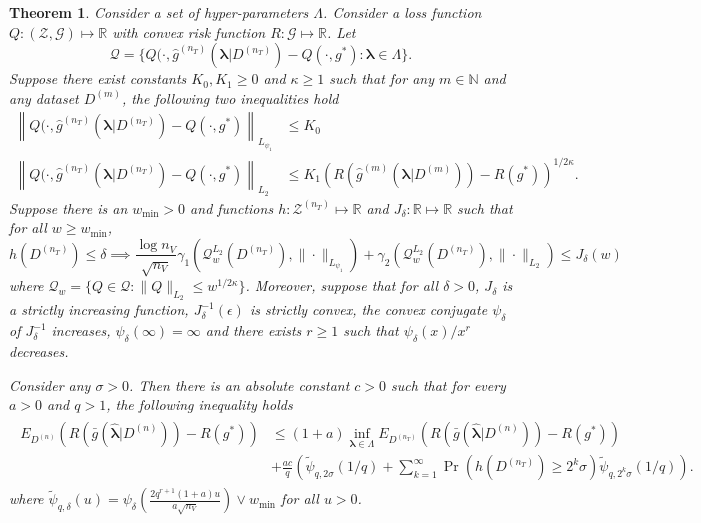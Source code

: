 \documentclass[10pt]{book}
\newtheorem{theorem}{Theorem}
\theoremstyle{definition}
\begin{document}
\begin{theorem}
	\label{thrm:jean_cv}
	Consider a set of hyper-parameters $\Lambda$. Consider a loss function $Q:(\mathcal{Z}, \mathcal{G}) \mapsto \mathbb{R}$ with convex risk function $R: \mathcal{G} \mapsto \mathbb{R}$. Let
	$$
	\mathcal{Q} = \{ 
	Q(\cdot, \hat{g}^{(n_T)}(\boldsymbol{\lambda} | D^{(n_T)}) - Q(\cdot, g^*) : \boldsymbol{\lambda} \in \Lambda \}.
	$$
	Suppose there exist constants $K_0, K_1 \ge 0$ and $\kappa \ge 1$ such that for any $m \in \mathbb{N}$ and any dataset $D^{(m)}$, the following two inequalities hold
	\begin{align}
	\left \| Q(\cdot, \hat{g}^{(n_T)}(\boldsymbol{\lambda} | D^{(n_T)}) - Q(\cdot, g^*) \right \|_{L_{\psi_1}} & \le K_0
	\label{eq:cv_assump1}\\
	\left \| Q(\cdot, \hat{g}^{(n_T)}(\boldsymbol{\lambda} | D^{(n_T)}) - Q(\cdot, g^*)  \right \|_{L_2} & \le 
	K_1 \left ( R(\hat{g}^{(m)}(\boldsymbol{\lambda}|D^{(m)})) - R(g^*) \right )^{1/2\kappa}.
	\label{eq:cv_assump2}
	\end{align}
	Suppose there is an $w_{\min} > 0$ and
	functions $h: {\mathcal{Z}}^{(n_T)} \mapsto \mathbb{R}$
	and $J_\delta: \mathbb{R}\mapsto \mathbb{R}$ such that
	for all $w \ge w_{\min}$,
	\[
	h(D^{(n_{T})})\le\delta\implies
	\frac{\log n_{V}}{\sqrt{n_{V}}}
	\gamma_{1}\left(\mathcal{Q}_{w}^{L_{2}}(D^{(n_{T})}),\|\cdot\|_{L_{\psi_{1}}}\right)
	+\gamma_{2}\left(\mathcal{Q}_{w}^{L_{2}}(D^{(n_{T})}),\|\cdot\|_{L_{2}}\right)\le J_{\delta}(w)
	\]
	where $\mathcal{Q}_w = \{Q \in \mathcal{Q}: \| Q \|_{L_2} \le w^{1/2\kappa} \}$.
	Moreover, suppose that for all $\delta > 0$, $J_\delta$ is a strictly increasing function, $J_\delta^{-1}(\epsilon)$ is strictly convex,
	the convex conjugate $\psi_\delta$ of $J^{-1}_\delta$ increases, $\psi_\delta(\infty ) = \infty$ and there exists $r \ge 1$ such that $\psi_\delta(x)/x^r$ decreases.
	
	Consider any $\sigma > 0$. Then there is an absolute constant $c > 0$ such that for every $a > 0$ and $q > 1$, the following inequality holds
	\begin{align}
	\begin{split}
	E_{D^{(n)}} 
	\left(
	R\left(\bar{g} ( \hat{\boldsymbol \lambda} | {D^{(n)}} ) \right )
	- R (g^*)
	\right)
	&\le
	(1+a) \inf_{\boldsymbol{\lambda} \in \Lambda} 
	E_{D^{(n_T)}}
	\left(
	R\left(\bar{g} ( \hat{\boldsymbol \lambda} | {D^{(n)}} ) \right )
	- R (g^*)
	\right)
	\\
	& +
	\frac{ac}{q}
	\left(
	\tilde{\psi}_{q,2\sigma}(1/q)
	+\sum_{k=1}^{\infty}
	\Pr\left(h\left(D^{(n_{T})}\right)\ge2^{k}\sigma\right)
	\tilde{\psi}_{q,2^{k}\sigma}(1/q)
	\right).
	\end{split}
	\end{align}
	where $\tilde{\psi}_{q, \delta}(u) = \psi_\delta\left(\frac{2q^{r+1}(1 + a)u}{a\sqrt{n_V}}\right) \vee w_{\min}$ for all $u > 0$.
\end{theorem}
\end{document}
